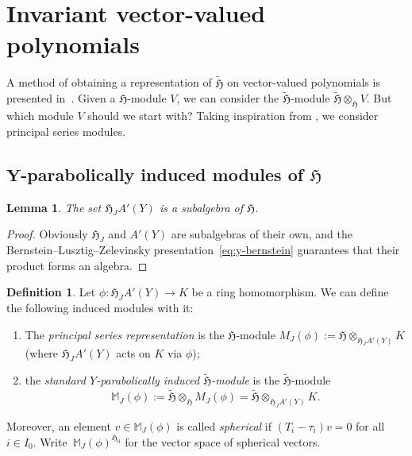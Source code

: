 \documentclass[10pt,a4paper]{amsart}
\newtheorem{Lemma}[Theorem]{Lemma}
\theoremstyle{definition}
\newtheorem{Definition}[Theorem]{Definition}
\numberwithin{equation}{section}
\begin{document}
\section{Invariant vector-valued polynomials}\label{sec:jasper}
A method of obtaining a representation of $\tilde{\mathfrak{H}}$ on
vector-valued polynomials is presented in~\cite{cherednikInduced}. Given a
$\mathfrak{H}$-module $V$, we can consider the $\tilde{\mathfrak{H}}$-module
$\tilde{\mathfrak{H}}\otimes_{\mathfrak{H}}V$. But which module $V$ should
we start with? Taking inspiration from \cite[Section~3]{stokmanInduced},
we consider principal series modules.

\subsection[Y-parabolically induced modules of H]{$\boldsymbol{ Y}$-parabolically induced modules of $\boldsymbol{\mathfrak{H}}$}
\label{sec:parabolically-induced}
\begin{Lemma}
 The set $\mathfrak{H}_J A'(Y)$ is a subalgebra of $\mathfrak{H}$.
\end{Lemma}
\begin{proof}
 Obviously $\mathfrak{H}_J$ and $A'(Y)$ are subalgebras of their own, and
 the Bernstein--Lusztig--Zelevinsky presentation~\eqref{eq:y-bernstein}
guarantees that their product forms an algebra.
\end{proof}

\begin{Definition}
 Let $\phi\colon \mathfrak{H}_J A'(Y)\to K$ be a ring homomorphism.
 We can define the following induced modules with it:
 \begin{enumerate}\itemsep=0pt
 \item[(i)] The \emph{principal series representation} is
 the $\mathfrak{H}$-module
$
 M_J(\phi) \!\!:=\! \mathfrak{H} \otimes_{\mathfrak{H}_JA'(Y)}\! K
$
(where $\mathfrak{H}_JA'(Y)$ acts on $K$ via $\phi$);
\item[(ii)] the \emph{standard $Y$-parabolically induced $\tilde{\mathfrak{H}}$-module} is the $\tilde{\mathfrak{H}}$-module
 \[
 \mathbb{M}_J(\phi) := \tilde{\mathfrak{H}}\otimes_{\mathfrak{H}}
 M_J(\phi) = \tilde{\mathfrak{H}}\otimes_{\mathfrak{H}_JA'(Y)} K.
 \]
 \end{enumerate}
 Moreover, an element $v\in\mathbb{M}_J(\phi)$ is called \emph{spherical} if
 $(T_i-\tau_i) v = 0$ for all $i\in I_0$. Write~$\mathbb{M}_J(\phi)^{\mathfrak{H}_0}$ for the vector space of spherical
 vectors.
\end{Definition}
\end{document}
